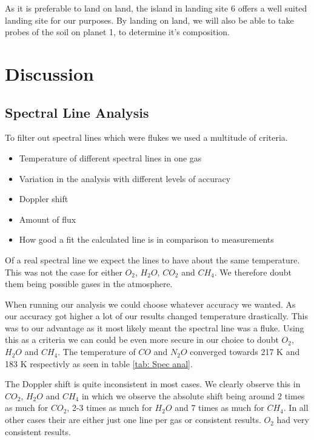 \documentclass[reprint,english,notitlepage]{revtex4-2}
\begin{document}
    As it is preferable to land on land, the island in landing site 6 offers a well suited landing site for our purposes.
    By landing on land, we will also be able to take probes of the soil on planet 1, to determine it's composition.

\section{Discussion} \label{sec: discussion}
\subsection{Spectral Line Analysis} \label{ssec: Spec Anal}
  
To filter out spectral lines which were flukes we used a multitude of criteria.

\begin{itemize}
  \item Temperature of different spectral lines in one gas
  \item Variation in the analysis with different levels of accuracy
  \item Doppler shift
  \item Amount of flux
  \item How good a fit the calculated line is in comparison to measurements
\end{itemize}

Of a real spectral line we expect the lines to have about the same temperature. This was not the case for either $ O_{2} $, $ H_2O  $, $ CO_2 $ and $ CH_4 $. We therefore doubt them being possible gases in the atmosphere.
\newline

When running our analysis we could choose whatever accuracy we wanted. As our accuracy got higher a lot of our results changed temperature drastically. This was to our advantage as it most likely meant the spectral line was a fluke. Using this as a criteria we can could be even more secure in our choice to doubt $ O_2 $, $ H_2O $ and $ CH_4 $. The temperature of $ CO $ and $ N_2O $  converged towards 217 K and 183 K respectivly as seen in table \ref{tab: Spec anal}.
\newline

The Doppler shift is quite inconsistent in most cases. We clearly observe this in $ CO_2 $, $ H_2O $ and $ CH_4 $ in which we observe the absolute shift being around 2 times as much for $ CO_2 $, 2-3 times as much for $ H_2O $ and 7 times as much for $ CH_4 $. In all other cases their are either just one line per gas or consistent results. $ O_2 $ had very consistent results. 
\newline
\end{document}
